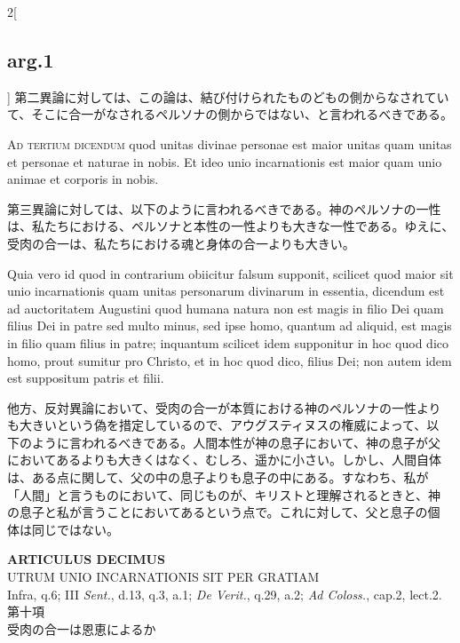 \documentclass[paper=a4paper,fontsize=10pt,jafontsize=9pt,titlepage]{jlreq}
\begin{document}
\begin{paracol}{2}[\subsection{arg.1}]
第二異論に対しては、この論は、結び付けられたものどもの側からなされてい
て、そこに合一がなされるペルソナの側からではない、と言われるべきである。

\switchcolumn*[\subsection{ad.3}]

{\scshape Ad tertium dicendum} quod unitas divinae personae est maior
unitas quam unitas et personae et naturae in nobis. Et ideo unio
incarnationis est maior quam unio animae et corporis in nobis.

\switchcolumn

第三異論に対しては、以下のように言われるべきである。神のペルソナの一性
は、私たちにおける、ペルソナと本性の一性よりも大きな一性である。ゆえに、
受肉の合一は、私たちにおける魂と身体の合一よりも大きい。

\switchcolumn*

Quia vero id quod in contrarium obiicitur falsum supponit, scilicet
quod maior sit unio incarnationis quam unitas personarum divinarum in
essentia, dicendum est ad auctoritatem Augustini quod humana natura
non est magis in filio Dei quam filius Dei in patre sed multo minus,
sed ipse homo, quantum ad aliquid, est magis in filio quam filius in
patre; inquantum scilicet idem supponitur in hoc quod dico homo, prout
sumitur pro Christo, et in hoc quod dico, filius Dei; non autem idem
est suppositum patris et filii.

\switchcolumn

他方、反対異論において、受肉の合一が本質における神のペルソナの一性より
も大きいという偽を措定しているので、アウグスティヌスの権威によって、以
下のように言われるべきである。人間本性が神の息子において、神の息子が父
においてあるよりも大きくはなく、むしろ、遥かに小さい。しかし、人間自体
は、ある点に関して、父の中の息子よりも息子の中にある。すなわち、私が
「人間」と言うものにおいて、同じものが、キリストと理解されるときと、神
の息子と私が言うことにおいてあるという点で。これに対して、父と息子の個
体は同じではない。

\end{paracol}
\newpage




{}
\setcounter{section}{10}
\setcounter{subsection}{0}
\begin{center}
{\Large {\bfseries ARTICULUS DECIMUS}}\\ {\large UTRUM UNIO INCARNATIONIS
SIT PER GRATIAM}\\ {\footnotesize Infra, q.6; III {\itshape Sent.},
d.13, q.3, a.1; {\itshape De Verit.}, q.29, a.2; {\itshape Ad
Coloss.}, cap.2, lect.2.}\\ {\Large 第十項\\受肉の合一は恩恵によるか}
\end{center}
\end{document}
